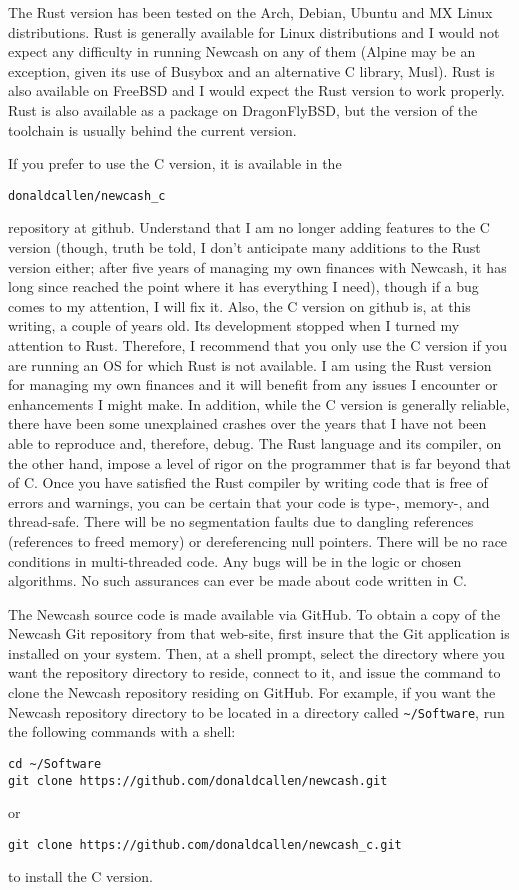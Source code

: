 \documentclass{report}
\begin{document}
The Rust version has been tested on the Arch, Debian, Ubuntu and MX Linux distributions. Rust is generally available for Linux distributions and I would not expect any difficulty in running Newcash on any of them (Alpine may be an exception, given its use
of Busybox and an alternative C library, Musl). Rust is also available on FreeBSD and I would expect the Rust version to work properly. Rust is also available as a package on DragonFlyBSD, but the version of the toolchain is usually behind
the current version. 

If you prefer to use the C version, it is available in the
\begin{verbatim}
donaldcallen/newcash_c
\end{verbatim}
repository at github. Understand that I am no longer adding features to the C version (though, truth be told, 
I don't anticipate many additions to the Rust version either; after five years of managing my own finances with Newcash, it has long since reached the point where it has everything
I need), though if a bug comes to my attention, I will fix it. Also, the C version on github is, at this writing, a couple of years old. Its development stopped when I turned my attention to Rust. Therefore, I recommend that you only use the C version if you are running an OS for which Rust is not available. I am using the Rust version for managing my own finances and it will benefit from any issues I encounter or enhancements I might make. In addition, while the C version is generally reliable, there have been some unexplained crashes over the years that I have not been able to reproduce and, therefore, debug.
The Rust language and its compiler, on the other hand, impose a level of rigor on the programmer that is far beyond that of C. Once you have satisfied the Rust compiler by writing code that is free of errors and warnings, you can be certain that your code is
type-, memory-, and thread-safe. There will be no segmentation faults due to dangling references (references to freed memory) or dereferencing null pointers. There will be no race conditions in multi-threaded code. Any bugs will be in the logic or chosen algorithms.  No such assurances can ever be made about code written in C.

The Newcash source code is made available via GitHub. To obtain a copy of the Newcash Git repository from that web-site, first insure that the Git application is installed on your system. 
Then, at a shell prompt, select the directory where you want the repository directory to reside, connect to it, and issue the command to clone the Newcash repository residing on GitHub. 
For example, if you want the Newcash repository directory to be located in a directory called \verb|~/Software|, run the following commands with a shell:
\begin{verbatim}
cd ~/Software
git clone https://github.com/donaldcallen/newcash.git
\end{verbatim}
or
\begin{verbatim}
git clone https://github.com/donaldcallen/newcash_c.git
\end{verbatim}
to install the C version.
\end{document}
